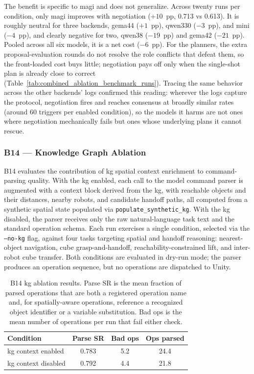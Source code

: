 The benefit is specific to \gls{magi} and does not generalize. Across twenty runs per condition, only \gls{magi} improves with negotiation ($+10$~pp, 0.713 vs 0.613). It is roughly neutral for three backends, \gls{gema44} ($+1$~pp), \gls{qwen330} ($-3$~pp), and \gls{mini} ($-4$~pp), and clearly negative for two, \gls{qwen38} ($-19$~pp) and \gls{gema42} ($-21$~pp). Pooled across all six models, it is a net cost ($-6$~pp). For the planners, the extra proposal-evaluation rounds do not resolve the role conflicts that defeat them, so the front-loaded cost buys little; negotiation pays off only when the single-shot plan is already close to correct (Table~\ref{tab:combined_ablation_benchmark_runs}). Tracing the same behavior across the other backends' logs confirmed this reading: wherever the logs capture the protocol, negotiation fires and reaches consensus at broadly similar rates (around 60 triggers per enabled condition), so the models it harms are not ones where negotiation mechanically fails but ones whose underlying plans it cannot rescue.

\subsubsection{B14 — Knowledge Graph Ablation}\label{sec:results-kg}
B14 evaluates the contribution of \gls{kg} spatial context enrichment to command-parsing quality. With the \gls{kg} enabled, each call to the model command parser is augmented with a context block derived from the \gls{kg}, with reachable objects and their distances, nearby robots, and candidate handoff paths, all computed from a synthetic spatial state populated via \texttt{populate\_synthetic\_kg}. With the \gls{kg} disabled, the parser receives only the raw natural-language task text and the standard operation schema. Each run exercises a single condition, selected via the \texttt{--no-kg} flag, against four tasks targeting spatial and handoff reasoning: nearest-object navigation, cube grasp-and-handoff, reachability-constrained lift, and inter-robot cube transfer. Both conditions are evaluated in dry-run mode; the parser produces an operation sequence, but no operations are dispatched to Unity.

\begin{table}[t]
	\centering
	\begin{tabular}{lccc}
		\hline
		\textbf{Condition}        & \textbf{Parse SR}   &
		\textbf{Bad ops}          & \textbf{Ops parsed}              \\
		\hline
		\gls{kg} context enabled  & 0.783               & 5.2 & 24.4 \\
		\gls{kg} context disabled & 0.792               & 4.4 & 21.8 \\
		\hline
	\end{tabular}
	\caption{B14 \gls{kg} ablation results. Parse SR is the mean fraction of parsed operations that are both a registered operation name and, for spatially-aware operations, reference a recognized object identifier or a variable substitution. Bad ops is the mean number of operations per run that fail either check.}
	\label{tab:b14-results}
\end{table}

